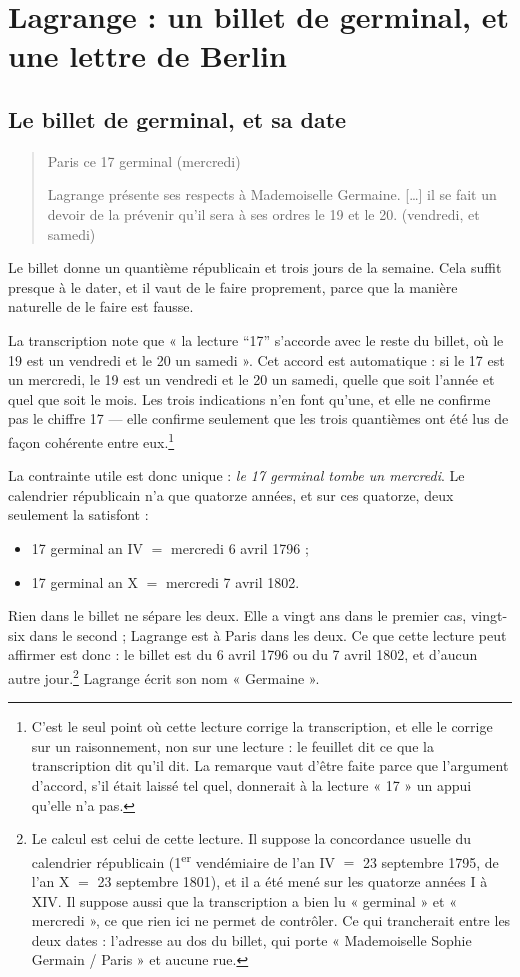 \documentclass[11pt,a4paper]{article}
\begin{document}
\section*{Lagrange : un billet de germinal, et une lettre de Berlin}


\subsection*{Le billet de germinal, et sa date}

\begin{quote}
Paris ce 17 germinal (mercredi)

Lagrange présente ses respects à Mademoiselle Germaine. […] il se fait un
devoir de la prévenir qu'il sera à ses ordres le 19 et le 20. (vendredi, et
samedi)
\end{quote}
Le billet donne un quantième républicain et trois jours de la semaine. Cela
suffit presque à le dater, et il vaut de le faire proprement, parce que la
manière naturelle de le faire est fausse.

La transcription note que « la lecture “17” s'accorde avec le reste du billet,
où le 19 est un vendredi et le 20 un samedi ». Cet accord est automatique : si
le 17 est un mercredi, le 19 est un vendredi et le 20 un samedi, quelle que
soit l'année et quel que soit le mois. Les trois indications n'en font qu'une,
et elle ne confirme pas le chiffre 17 --- elle confirme seulement que les trois
quantièmes ont été lus de façon cohérente entre eux.\footnote{C'est le seul
point où cette lecture corrige la transcription, et elle le corrige sur un
raisonnement, non sur une lecture : le feuillet dit ce que la transcription dit
qu'il dit. La remarque vaut d'être faite parce que l'argument d'accord, s'il
était laissé tel quel, donnerait à la lecture « 17 » un appui qu'elle n'a pas.}

La contrainte utile est donc unique : \emph{le 17 germinal tombe un mercredi}.
Le calendrier républicain n'a que quatorze années, et sur ces quatorze, deux
seulement la satisfont :
\begin{itemize}
  \item 17 germinal an IV $=$ mercredi 6 avril 1796 ;
  \item 17 germinal an X $=$ mercredi 7 avril 1802.
\end{itemize}
Rien dans le billet ne sépare les deux. Elle a vingt ans dans le premier cas,
vingt-six dans le second ; Lagrange est à Paris dans les deux. Ce que cette
lecture peut affirmer est donc : le billet est du 6 avril 1796 ou du 7 avril
1802, et d'aucun autre jour.\footnote{Le calcul est celui de cette lecture. Il
suppose la concordance usuelle du calendrier républicain (1\textsuperscript{er}
vendémiaire de l'an IV $=$ 23 septembre 1795, de l'an X $=$ 23 septembre 1801),
et il a été mené sur les quatorze années I à XIV. Il suppose aussi que la
transcription a bien lu « germinal » et « mercredi », ce que rien ici ne permet
de contrôler. Ce qui trancherait entre les deux dates : l'adresse au dos du
billet, qui porte « Mademoiselle Sophie Germain / Paris » et aucune rue.}
Lagrange écrit son nom « Germaine ».
\end{document}

